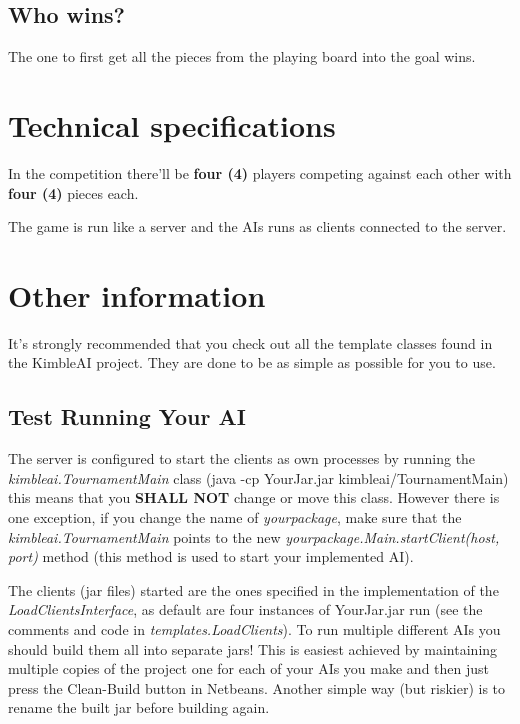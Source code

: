 \documentclass[10pt,a4paper]{article}
\begin{document}

\subsection{Who wins?}

The one to first get all the pieces from the playing board into the goal wins.


\section{Technical specifications}
\label{sec:tech-specs}


In the competition there'll be \textbf{four (4)} players competing against each other with \textbf{four (4)} pieces each.

The game is run like a server and the AIs runs as clients connected to the server.



\section{Other information}
\label{sec:other-info}


It's strongly recommended that you check out all the template classes found in the KimbleAI project. They are done to be as simple as possible for you to use.

\subsection{Test Running Your AI}

The server is configured to start the clients as own processes by running the \textit{kimbleai.TournamentMain} class (java -cp YourJar.jar kimbleai/TournamentMain) this means that you \textbf{SHALL NOT} change or move this class. However there is one exception, if you change the name of \textit{yourpackage}, make sure that the \textit{kimbleai.TournamentMain} points to the new \textit{yourpackage.Main.startClient(host, port)} method (this method is used to start your implemented AI).

The clients (jar files) started are the ones specified in the implementation of the \textit{LoadClientsInterface}, as default are four instances of YourJar.jar run (see the comments and code in \textit{templates.LoadClients}). To run multiple different AIs you should build them all into separate jars! This is easiest achieved by maintaining multiple copies of the project one for each of your AIs you make and then just press the Clean-Build button in Netbeans. Another simple way (but riskier) is to rename the built jar before building again.
\end{document}

